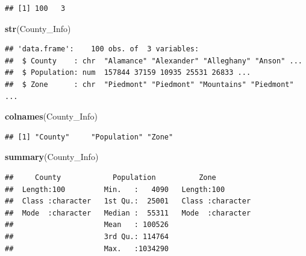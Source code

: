 \documentclass[12pt,]{article}
\newenvironment{Shaded}{\begin{snugshade}}{\end{snugshade}}
\newcommand{\KeywordTok}[1]{\textcolor[rgb]{0.13,0.29,0.53}{\textbf{#1}}}
\newcommand{\OperatorTok}[1]{\textcolor[rgb]{0.81,0.36,0.00}{\textbf{#1}}}
\newcommand{\NormalTok}[1]{#1}
\begin{document}
\begin{verbatim}
## [1] 100   3
\end{verbatim}

\begin{Shaded}
\begin{Highlighting}[]
\KeywordTok{str}\NormalTok{(County_Info)}
\end{Highlighting}
\end{Shaded}

\begin{verbatim}
## 'data.frame':    100 obs. of  3 variables:
##  $ County    : chr  "Alamance" "Alexander" "Alleghany" "Anson" ...
##  $ Population: num  157844 37159 10935 25531 26833 ...
##  $ Zone      : chr  "Piedmont" "Piedmont" "Mountains" "Piedmont" ...
\end{verbatim}

\begin{Shaded}
\begin{Highlighting}[]
\KeywordTok{colnames}\NormalTok{(County_Info)}
\end{Highlighting}
\end{Shaded}

\begin{verbatim}
## [1] "County"     "Population" "Zone"
\end{verbatim}

\begin{Shaded}
\begin{Highlighting}[]
\KeywordTok{summary}\NormalTok{(County_Info)}
\end{Highlighting}
\end{Shaded}

\begin{verbatim}
##     County            Population          Zone          
##  Length:100         Min.   :   4090   Length:100        
##  Class :character   1st Qu.:  25001   Class :character  
##  Mode  :character   Median :  55311   Mode  :character  
##                     Mean   : 100526                     
##                     3rd Qu.: 114764                     
##                     Max.   :1034290
\end{verbatim}

\begin{Shaded}
\end{Shaded}
\end{document}
